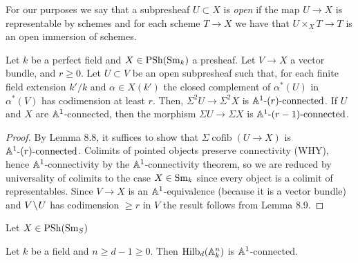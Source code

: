 \documentclass[12pt]{article}
\DeclareMathOperator{\cofib}{\mathrm{cofib}}
\begin{document}
\begin{rmk}
For our purposes we say that a subpresheaf $U \subset X$ is \textit{open} if the map $U \to X$ is representable by schemes and for each scheme $T \to X$ we have that $U \times_X T \to T$ is an open immersion of schemes.
\end{rmk}

\begin{prop}[8.10]
Let $k$ be a perfect field and $X \in \mathrm{PSh}(\mathrm{Sm}_k)$ a presheaf. Let $V \to X$ a vector bundle, and $r \ge 0$. Let $U \subset V$ be an open subpresheaf such that, for each finite field extension $k'/k$ and $\alpha \in X(k')$ the closed complement of $\alpha^*(U)$ in $\alpha^*(V)$ has codimension at least $r$. Then, $\Sigma^2 U \to \Sigma^2 X$ is $\mathbb{A}^1\text{-}(r)\text{-connected}$. If $U$ and $X$ are $\mathbb{A}^1$-connected, then the morphism $\Sigma U \to \Sigma X$ is $\mathbb{A}^1\text{-}(r-1)\text{-connected}$.
\end{prop}

\begin{proof}
By Lemma 8.8, it suffices to show that $\Sigma \cofib(U \to X)$ is $\mathbb{A}^1\text{-}(r)\text{-connected}$. Colimits of pointed objects preserve connectivity (WHY), hence $\mathbb{A}^1$-connectivity by the $\mathbb{A}^1$-connectivity theorem, so we are reduced by universality of colimits to the case $X \in \mathrm{Sm}_k$ since every object is a colimit of representables. Since $V \to X$ is an $\mathbb{A}^1$-equivalence (because it is a vector bundle) and $V \! \setminus \! U$ has codimension $\ge r$ in $V$ the result follows from Lemma 8.9. 
\end{proof}

\begin{lemma}
Let $X \in \mathrm{PSh}(\mathrm{Sm}_S)$ 
\end{lemma}

\begin{lemma}[8.11]
Let $k$ be a field and $n \ge d - 1 \ge 0$. Then $\mathrm{Hilb}_d(\mathbb{A}^n_k)$ is $\mathbb{A}^1$-connected.
\end{lemma}
\end{document}
